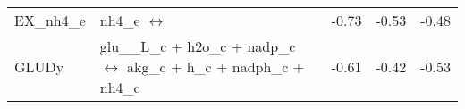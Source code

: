 \begin{tabular}{lp{}ccc}
EX\_nh4\_e	&	nh4\_e $\leftrightarrow$ 	&	-0.73	&	-0.53	&	-0.48	\\
GLUDy	&	glu\_\_L\_c + h2o\_c + nadp\_c $\leftrightarrow$ akg\_c + h\_c + nadph\_c + nh4\_c	&	-0.61	&	-0.42	&	-0.53	\\

\end{tabular}
